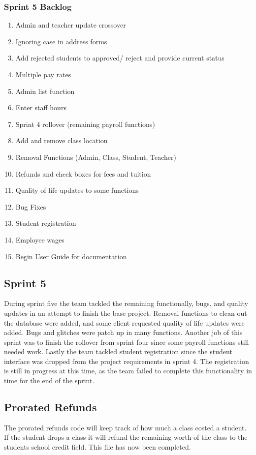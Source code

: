 \subsubsection{Sprint 5 Backlog}

\begin{enumerate}
\item Admin and teacher update crossover
\item Ignoring case in address forms
\item Add rejected students to approved/ reject and provide current status
\item Multiple pay rates
\item Admin list function
\item Enter staff hours
\item Sprint 4 rollover (remaining payroll functions)
\item Add and remove class location
\item Removal Functions (Admin, Class, Student, Teacher)
\item Refunds and check boxes for fees and tuition
\item Quality of life updates to some functions
\item Bug Fixes
\item Student registration
\item Employee wages
\item Begin User Guide for documentation
\end{enumerate}


\subsection{Sprint 5}
During sprint five the team tackled the remaining functionally, bugs, and quality updates in an attempt to finish the base project. Removal functions to clean out the database were added, and some client requested quality of life updates were added. Bugs and glitches were patch up in many functions. Another job of this sprint was to finish the rollover from sprint four since some payroll functions still needed work. Lastly the team tackled student registration since the student interface was dropped from the project requirements in sprint 4. The registration is still in progress at this time, as the team failed to complete this functionality in time for the end of the sprint.

\subsection{Prorated Refunds}
The prorated refunds code will keep track of how much a class costed a student. If the student drops a class it will refund the remaining worth of the class to the students school credit field. This file has now been completed.

